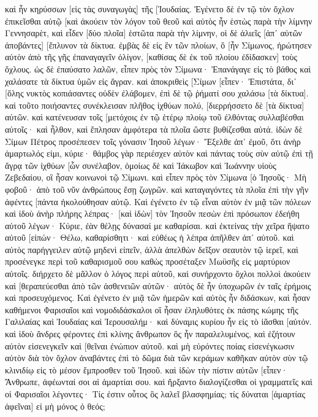 καὶ ἦν κηρύσσων [εἰς τὰς συναγωγὰς] τῆς [Ἰουδαίας. 
Ἐγένετο δὲ ἐν τῷ τὸν ὄχλον ἐπικεῖσθαι αὐτῷ [καὶ ἀκούειν τὸν λόγον τοῦ θεοῦ καὶ αὐτὸς ἦν ἑστὼς παρὰ τὴν λίμνην Γεννησαρὲτ, 
καὶ εἶδεν [δύο πλοῖα] ἑστῶτα παρὰ τὴν λίμνην, οἱ δὲ ἁλιεῖς [ἀπ᾽ αὐτῶν ἀποβάντες] [ἔπλυνον τὰ δίκτυα. 
ἐμβὰς δὲ εἰς ἓν τῶν πλοίων, ὃ [ἦν Σίμωνος, ἠρώτησεν αὐτὸν ἀπὸ τῆς γῆς ἐπαναγαγεῖν ὀλίγον, [καθίσας δὲ ἐκ τοῦ πλοίου ἐδίδασκεν] τοὺς ὄχλους. 
ὡς δὲ ἐπαύσατο λαλῶν, εἶπεν πρὸς τὸν Σίμωνα· Ἐπανάγαγε εἰς τὸ βάθος καὶ χαλάσατε τὰ δίκτυα ὑμῶν εἰς ἄγραν. 
καὶ ἀποκριθεὶς [Σίμων [εἶπεν· Ἐπιστάτα, δι᾽ [ὅλης νυκτὸς κοπιάσαντες οὐδὲν ἐλάβομεν, ἐπὶ δὲ τῷ ῥήματί σου χαλάσω [τὰ δίκτυα]. 
καὶ τοῦτο ποιήσαντες συνέκλεισαν πλῆθος ἰχθύων πολύ, [διερρήσσετο δὲ [τὰ δίκτυα] αὐτῶν. 
καὶ κατένευσαν τοῖς [μετόχοις ἐν τῷ ἑτέρῳ πλοίῳ τοῦ ἐλθόντας συλλαβέσθαι αὐτοῖς· καὶ ἦλθον, καὶ ἔπλησαν ἀμφότερα τὰ πλοῖα ὥστε βυθίζεσθαι αὐτά. 
ἰδὼν δὲ Σίμων Πέτρος προσέπεσεν τοῖς γόνασιν Ἰησοῦ λέγων· Ἔξελθε ἀπ᾽ ἐμοῦ, ὅτι ἀνὴρ ἁμαρτωλός εἰμι, κύριε· 
θάμβος γὰρ περιέσχεν αὐτὸν καὶ πάντας τοὺς σὺν αὐτῷ ἐπὶ τῇ ἄγρᾳ τῶν ἰχθύων [ὧν συνέλαβον, 
ὁμοίως δὲ καὶ Ἰάκωβον καὶ Ἰωάννην υἱοὺς Ζεβεδαίου, οἳ ἦσαν κοινωνοὶ τῷ Σίμωνι. καὶ εἶπεν πρὸς τὸν Σίμωνα [ὁ Ἰησοῦς· Μὴ φοβοῦ· ἀπὸ τοῦ νῦν ἀνθρώπους ἔσῃ ζωγρῶν. 
καὶ καταγαγόντες τὰ πλοῖα ἐπὶ τὴν γῆν ἀφέντες [πάντα ἠκολούθησαν αὐτῷ. 
Καὶ ἐγένετο ἐν τῷ εἶναι αὐτὸν ἐν μιᾷ τῶν πόλεων καὶ ἰδοὺ ἀνὴρ πλήρης λέπρας· [καὶ ἰδὼν] τὸν Ἰησοῦν πεσὼν ἐπὶ πρόσωπον ἐδεήθη αὐτοῦ λέγων· Κύριε, ἐὰν θέλῃς δύνασαί με καθαρίσαι. 
καὶ ἐκτείνας τὴν χεῖρα ἥψατο αὐτοῦ [εἰπών· Θέλω, καθαρίσθητι· καὶ εὐθέως ἡ λέπρα ἀπῆλθεν ἀπ᾽ αὐτοῦ. 
καὶ αὐτὸς παρήγγειλεν αὐτῷ μηδενὶ εἰπεῖν, ἀλλὰ ἀπελθὼν δεῖξον σεαυτὸν τῷ ἱερεῖ, καὶ προσένεγκε περὶ τοῦ καθαρισμοῦ σου καθὼς προσέταξεν Μωϋσῆς εἰς μαρτύριον αὐτοῖς. 
διήρχετο δὲ μᾶλλον ὁ λόγος περὶ αὐτοῦ, καὶ συνήρχοντο ὄχλοι πολλοὶ ἀκούειν καὶ [θεραπεύεσθαι ἀπὸ τῶν ἀσθενειῶν αὐτῶν· 
αὐτὸς δὲ ἦν ὑποχωρῶν ἐν ταῖς ἐρήμοις καὶ προσευχόμενος. 
Καὶ ἐγένετο ἐν μιᾷ τῶν ἡμερῶν καὶ αὐτὸς ἦν διδάσκων, καὶ ἦσαν καθήμενοι Φαρισαῖοι καὶ νομοδιδάσκαλοι οἳ ἦσαν ἐληλυθότες ἐκ πάσης κώμης τῆς Γαλιλαίας καὶ Ἰουδαίας καὶ Ἰερουσαλήμ· καὶ δύναμις κυρίου ἦν εἰς τὸ ἰᾶσθαι [αὐτόν. 
καὶ ἰδοὺ ἄνδρες φέροντες ἐπὶ κλίνης ἄνθρωπον ὃς ἦν παραλελυμένος, καὶ ἐζήτουν αὐτὸν εἰσενεγκεῖν καὶ [θεῖναι ἐνώπιον αὐτοῦ. 
καὶ μὴ εὑρόντες ποίας εἰσενέγκωσιν αὐτὸν διὰ τὸν ὄχλον ἀναβάντες ἐπὶ τὸ δῶμα διὰ τῶν κεράμων καθῆκαν αὐτὸν σὺν τῷ κλινιδίῳ εἰς τὸ μέσον ἔμπροσθεν τοῦ Ἰησοῦ. 
καὶ ἰδὼν τὴν πίστιν αὐτῶν [εἶπεν· Ἄνθρωπε, ἀφέωνταί σοι αἱ ἁμαρτίαι σου. 
καὶ ἤρξαντο διαλογίζεσθαι οἱ γραμματεῖς καὶ οἱ Φαρισαῖοι λέγοντες· Τίς ἐστιν οὗτος ὃς λαλεῖ βλασφημίας; τίς δύναται [ἁμαρτίας ἀφεῖναι] εἰ μὴ μόνος ὁ θεός; 
